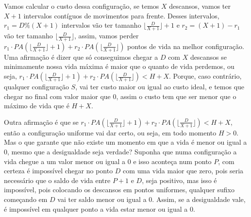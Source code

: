 Vamos calcular o custo dessa configuração, se temos $X$ descansos, vamos ter $X+1$ intervalos contíguos de movimentos para frente. Desses intervalos, $r_1 = D\%(X+1)$ intervalos vão ter tamanho $\lfloor\frac{D}{X+1}\rfloor+1$ e $r_2 = (X+1) - r_1$ vão ter tamanho $\lfloor\frac{D}{X+1}\rfloor$, assim, vamos perder $r_1 \cdot PA\left(\lfloor\frac{D}{X+1}\rfloor + 1\right) + r_2 \cdot PA\left(\lfloor\frac{D}{X+1}\rfloor\right)$ pontos de vida na melhor configuração. Uma afirmação é dizer que só conseguimos chegar a $D$ com $X$ descansos se minimamente nossa vida máxima é maior que o quanto de vida perdemos, ou seja, $r_1 \cdot PA\left(\lfloor\frac{D}{X+1}\rfloor + 1\right) + r_2 \cdot PA\left(\lfloor\frac{D}{X+1}\rfloor\right) < H + X$. Porque, caso contrário, qualquer configuração $S$, vai ter custo maior ou igual ao custo ideal, e temos que chegar no final com valor maior que $0$, assim o custo tem que ser menor que o máximo de vida que é $H + X$.

Outra afirmação é que se $r_1 \cdot PA\left(\lfloor\frac{D}{X+1}\rfloor + 1\right) + r_2 \cdot PA\left(\lfloor\frac{D}{X+1}\rfloor\right) < H + X$, então a configuração uniforme vai dar certo, ou seja, em todo momento $H > 0$. Mas o que garante que não existe um momento em que a vida é menor ou igual a $0$, mesmo que a desigualdade seja verdade? Suponha que numa configuração a vida chegue a um valor menor ou igual a $0$ e isso aconteça num ponto $P$, com certeza é impossível chegar no ponto $D$ com uma vida maior que zero, pois seria necessário que o saldo de vida entre $P+1$ e $D$, seja positivo, mas isso é impossível, pois colocando os descansos em pontos uniformes, qualquer sufixo começando em $D$ vai ter saldo menor ou igual a $0$. Assim, se a desigualdade vale, é impossível em qualquer ponto a vida estar menor ou igual a $0$.

